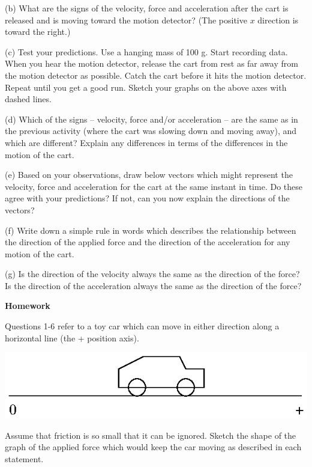 \pagebreak[3]
(b) What are the signs of the velocity, force and acceleration after the cart
is released and is moving toward the motion detector? (The positive $x$ direction
is toward the right.)
\answerspace{20mm}

(c) Test your predictions. Use a hanging mass of 100 g. Start recording data.
When you hear the motion detector, release the cart from rest as far away from
the motion detector as possible. Catch the cart before it hits the motion detector.
Repeat until you get a good run. Sketch your graphs on the above axes with dashed
lines.

(d) Which of the signs -- velocity, force and/or acceleration -- are the same as
in the previous activity (where the cart was slowing down and moving away), and
which are different? Explain any differences in terms of the differences in
the motion of the cart.
\answerspace{20mm}

(e) Based on your observations, draw below vectors which might represent the
velocity, force and acceleration for the cart at the same instant in time. Do
these agree with your predictions? If not, can you now explain the directions
of the vectors?
\answerspace{30mm}

(f) Write down a simple rule in words which describes the relationship between
the direction of the applied force and the direction of the acceleration for
any motion of the cart.
\answerspace{20mm}

(g) Is the direction of the velocity always the same as the direction of the
force? Is the direction of the acceleration always the same as the direction
of the force?
\answerspace{20mm}

\pagebreak[2]
\textbf{Homework }

Questions 1-6 refer to a toy car which can move in either direction along a
horizontal line (the + position axis).

\vspace{0.3cm}
{\par\centering \includegraphics{force2/force2_fig6.eps} \par}
\vspace{0.3cm}

Assume that friction is so small that it can be ignored. Sketch the shape of
the graph of the applied force which would keep the car moving as described
in each statement.

